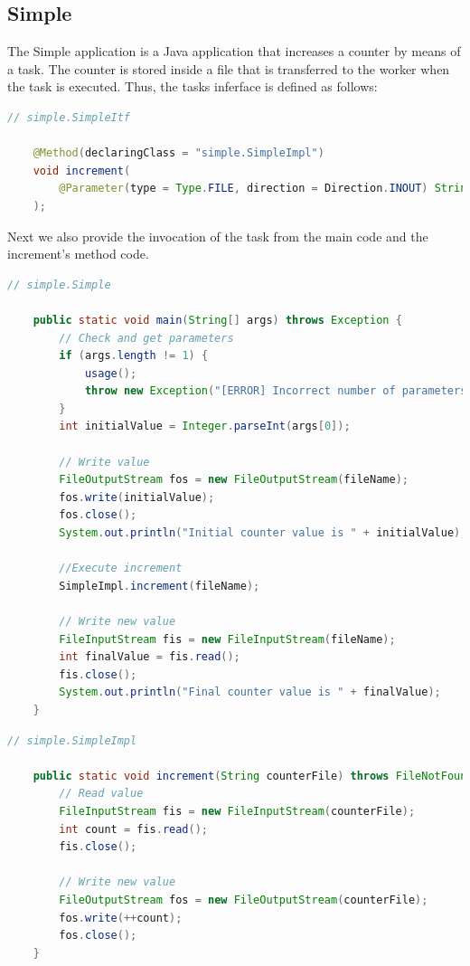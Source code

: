 \subsection{Simple}
The Simple application is a Java application that increases a counter by means of a task. The counter is stored inside a file that 
is transferred to the worker when the task is executed. Thus, the tasks inferface is defined as follows:

\begin{lstlisting}[language=java]
	// simple.SimpleItf
	
	@Method(declaringClass = "simple.SimpleImpl")
	void increment(
		@Parameter(type = Type.FILE, direction = Direction.INOUT) String file
	);
\end{lstlisting}

Next we also provide the invocation of the task from the main code and the increment's method code.

\begin{lstlisting}[language=java]
	// simple.Simple
	
	public static void main(String[] args) throws Exception {
		// Check and get parameters
		if (args.length != 1) {
			usage();
			throw new Exception("[ERROR] Incorrect number of parameters");
		}
		int initialValue = Integer.parseInt(args[0]);

		// Write value
		FileOutputStream fos = new FileOutputStream(fileName);
		fos.write(initialValue);
		fos.close();
		System.out.println("Initial counter value is " + initialValue);

		//Execute increment
		SimpleImpl.increment(fileName);

		// Write new value
		FileInputStream fis = new FileInputStream(fileName);
		int finalValue = fis.read();
		fis.close();
		System.out.println("Final counter value is " + finalValue);
	}
\end{lstlisting}

\begin{lstlisting}[language=java]
	// simple.SimpleImpl
	
	public static void increment(String counterFile) throws FileNotFoundException, IOException {
		// Read value
		FileInputStream fis = new FileInputStream(counterFile);
		int count = fis.read();
		fis.close();
		
		// Write new value
		FileOutputStream fos = new FileOutputStream(counterFile);
		fos.write(++count);
		fos.close();
	}
\end{lstlisting}

